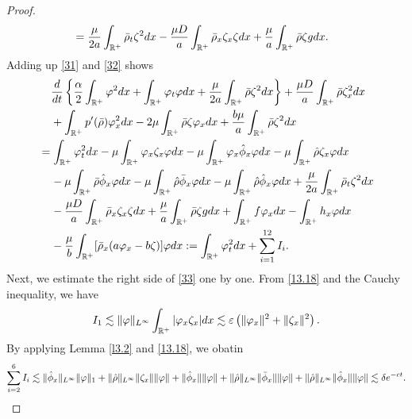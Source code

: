 \documentclass[10pt,a4paper]{amsart}
\begin{document}
\begin{proof}
\begin{align}
			&=\frac{\mu}{2a}\int_{\mathbb{R}^+}^{}\bar\rho_t\zeta^2{\rm d}x-\frac{\mu D}{a}\int_{\mathbb{R}^+}^{}\bar\rho_x\zeta_x\zeta {\rm d}x+\frac{\mu}{a}\int_{\mathbb{R}^+}^{}\bar\rho\zeta g {\rm d}x.
		\end{align}
		Adding up \eqref{31} and \eqref{32} shows
		\begin{align}\label{33}
			&\;\;\;\;\frac{{\rm d}}{{\rm d}t}\left\{\frac{\alpha}{2}\int_{\mathbb{R}^+}\varphi^2{\rm d}x+\int_{\mathbb{R}^+}^{}\varphi_t\varphi{\rm d}x+\frac{\mu}{2a}\int_{\mathbb{R}^+}^{}\bar\rho\zeta^2{\rm d}x\right\}+\frac{\mu D}{a}\int_{\mathbb{R}^+}^{}\bar\rho\zeta_x^2{\rm d}x	\notag\\
			&\;\;\;\;+\int_{\mathbb{R}^+}^{}p^{\prime}(\bar\rho)\varphi_x^2{\rm d}x-2\mu\int_{\mathbb{R}^+}^{}\bar\rho\zeta\varphi_x{\rm d}x+\frac{b\mu}{a}\int_{\mathbb{R}^+}^{}\bar\rho\zeta^2{\rm d}x\notag\\
			&=\int_{\mathbb{R}^+}\varphi_t^2{\rm d}x-\mu\int_{\mathbb{R}^+}^{}\varphi_x\zeta_x\varphi{\rm d}x-\mu\int_{\mathbb{R}^+}^{}\varphi_x\hat\phi_x\varphi{\rm d}x-\mu\int_{\mathbb{R}^+}^{}\hat\rho\zeta_x\varphi{\rm d}x\notag\\
			&\;\;\;\;-\mu\int_{\mathbb{R}^+}\bar\rho\hat\phi_x\varphi{\rm d}x-\mu\int_{\mathbb{R}^+}\hat\rho\bar\phi_x\varphi{\rm d}x-\mu\int_{\mathbb{R}^+}\hat\rho\hat\phi_x\varphi{\rm d}x+\frac{\mu}{2a}\int_{\mathbb{R}^+}^{}\bar\rho_t\zeta^2{\rm d}x\notag\\
			&\;\;\;\;-\frac{\mu D}{a}\int_{\mathbb{R}^+}^{}\bar\rho_x\zeta_x\zeta {\rm d}x+\frac{\mu}{a}\int_{\mathbb{R}^+}^{}\bar\rho\zeta g{\rm d}x+\int_{\mathbb{R}^+}^{}f\varphi_x{\rm d}x-\int_{\mathbb{R}^+}^{}h_x\varphi{\rm d}x\notag\\
			&\;\;\;\;-\frac{\mu}{b}\int_{\mathbb{R}^+}[\bar\rho_x(a\varphi_x-b\zeta)]\varphi{\rm d}x:=\int_{\mathbb{R}^+}\varphi_t^2{\rm d}x+\sum_{i=1}^{12}I_i.
		\end{align}
		Next, we estimate the right side of \eqref{33} one by one.
		From \eqref{13.18} and the Cauchy inequality, we have
		\begin{equation}\label{I1}
			I_1
			\lesssim\|\varphi\|_{L^{\infty}}\int_{\mathbb{R}^+}|\varphi_x\zeta_x|{\rm d}x
			\lesssim\varepsilon\left(\|\varphi_x\|^2+\|\zeta_x\|^2\right).
		\end{equation}
		By applying Lemma \ref{l3.2} and  \eqref{13.18}, we obatin
		\begin{equation}\label{I26}
			\sum_{i=2}^{6}I_i\lesssim \|\hat\phi_x\|_{L^{\infty}}\|\varphi\|_1+\|\hat\rho\|_{L^{\infty}}\|\zeta_x\|\|\varphi\|+\|\hat\phi_x\|\|\varphi\|+\|\hat\rho\|_{L^{\infty}}\|\bar\phi_x\|\|\varphi\|+\|\hat\rho\|_{L^{\infty}}\|\hat\phi_x\|\|\varphi\|\lesssim \delta{\rm e}^{-ct}.

\end{equation}
\end{proof}
\end{document}
